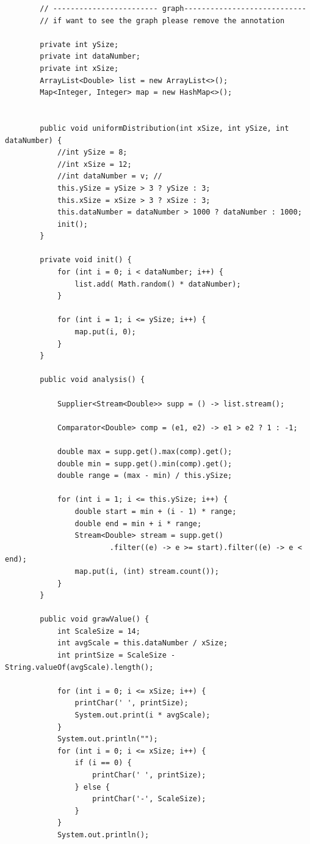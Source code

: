 \documentclass{article}
\begin{document}
\begin{verbatim}
        // ------------------------ graph----------------------------
        // if want to see the graph please remove the annotation

        private int ySize;
        private int dataNumber;
        private int xSize;
        ArrayList<Double> list = new ArrayList<>(); 
        Map<Integer, Integer> map = new HashMap<>(); 


        public void uniformDistribution(int xSize, int ySize, int dataNumber) {
            //int ySize = 8; 
            //int xSize = 12; 
            //int dataNumber = v; //
            this.ySize = ySize > 3 ? ySize : 3;
            this.xSize = xSize > 3 ? xSize : 3;
            this.dataNumber = dataNumber > 1000 ? dataNumber : 1000;
            init();
        }

        private void init() {
            for (int i = 0; i < dataNumber; i++) {
                list.add( Math.random() * dataNumber);
            }

            for (int i = 1; i <= ySize; i++) {
                map.put(i, 0);
            }
        }

        public void analysis() {

            Supplier<Stream<Double>> supp = () -> list.stream();
            
            Comparator<Double> comp = (e1, e2) -> e1 > e2 ? 1 : -1;
            
            double max = supp.get().max(comp).get();
            double min = supp.get().min(comp).get();
            double range = (max - min) / this.ySize;

            for (int i = 1; i <= this.ySize; i++) {
                double start = min + (i - 1) * range;
                double end = min + i * range;
                Stream<Double> stream = supp.get()
                        .filter((e) -> e >= start).filter((e) -> e < end);
                map.put(i, (int) stream.count());
            }
        }

        public void grawValue() {
            int ScaleSize = 14; 
            int avgScale = this.dataNumber / xSize;
            int printSize = ScaleSize - String.valueOf(avgScale).length();
            
            for (int i = 0; i <= xSize; i++) {
                printChar(' ', printSize);
                System.out.print(i * avgScale);
            }
            System.out.println("");
            for (int i = 0; i <= xSize; i++) {
                if (i == 0) {
                    printChar(' ', printSize);
                } else {
                    printChar('-', ScaleSize);
                }
            }
            System.out.println();
            

\end{verbatim}
\end{document}
